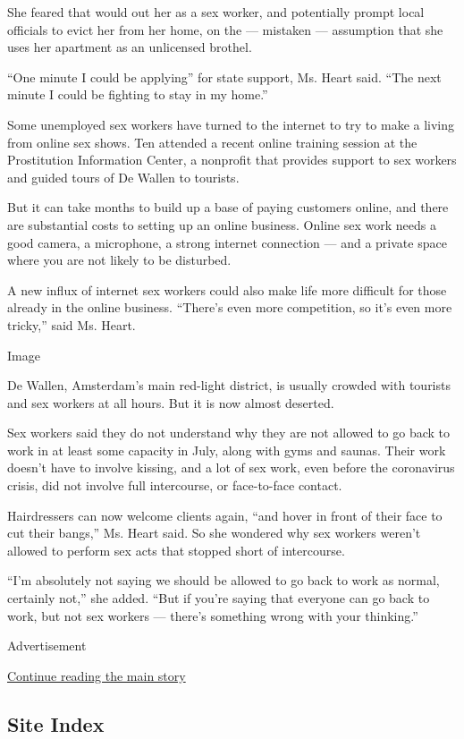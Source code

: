 She feared that would out her as a sex worker, and potentially prompt
local officials to evict her from her home, on the --- mistaken ---
assumption that she uses her apartment as an unlicensed brothel.

``One minute I could be applying'' for state support, Ms. Heart said.
``The next minute I could be fighting to stay in my home.''

Some unemployed sex workers have turned to the internet to try to make a
living from online sex shows. Ten attended a recent online training
session at the Prostitution Information Center, a nonprofit that
provides support to sex workers and guided tours of De Wallen to
tourists.

But it can take months to build up a base of paying customers online,
and there are substantial costs to setting up an online business. Online
sex work needs a good camera, a microphone, a strong internet connection
--- and a private space where you are not likely to be disturbed.

A new influx of internet sex workers could also make life more difficult
for those already in the online business. ``There's even more
competition, so it's even more tricky,'' said Ms. Heart.

Image

De Wallen, Amsterdam's main red-light district, is usually crowded with
tourists and sex workers at all hours. But it is now almost deserted.~

Sex workers said they do not understand why they are not allowed to go
back to work in at least some capacity in July, along with gyms and
saunas. Their work doesn't have to involve kissing, and a lot of sex
work, even before the coronavirus crisis, did not involve full
intercourse, or face-to-face contact.

Hairdressers can now welcome clients again, ``and hover in front of
their face to cut their bangs,'' Ms. Heart said. So she wondered why sex
workers weren't allowed to perform sex acts that stopped short of
intercourse.

``I'm absolutely not saying we should be allowed to go back to work as
normal, certainly not,'' she added. ``But if you're saying that everyone
can go back to work, but not sex workers --- there's something wrong
with your thinking.''

Advertisement

\protect\hyperlink{after-bottom}{Continue reading the main story}

\hypertarget{site-index}{%
\subsection{Site Index}\label{site-index}}

